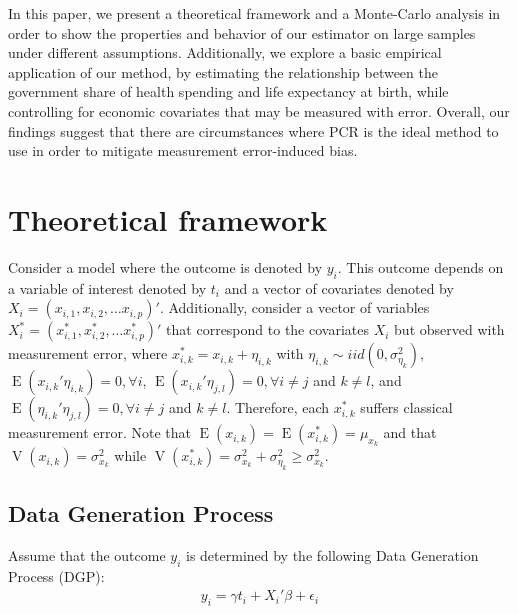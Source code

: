 \documentclass[10pt]{article}
\begin{document}
        In this paper, we present a theoretical framework and a Monte-Carlo analysis in order to show the properties and behavior of our estimator on large samples under different assumptions. Additionally, we explore a basic empirical application of our method, by estimating the relationship between the government share of health spending and life expectancy at birth, while controlling for economic covariates that may be measured with error. Overall, our findings suggest that there are circumstances where PCR is the ideal method to use in order to mitigate measurement error-induced bias.

    \section*{Theoretical framework}

        Consider a model where the outcome is denoted by $y_i$. This outcome depends on a variable of interest denoted by $t_i$ and a vector of covariates denoted by $X_i=(x_{i,1},x_{i,2},\dots x_{i,p})'$. Additionally, consider a vector of variables $X^*_i=(x^*_{i,1},x^*_{i,2},\dots x^*_{i,p})'$ that correspond to the covariates $X_i$ but observed with measurement error, where $x^*_{i,k}=x_{i,k}+\eta_{i,k}$ with $\eta_{i,k} \sim {iid}(0,\sigma^2_{\eta_k})$, $\operatorname{E}(x_{i,k}'\eta_{i,k})=0, \forall i$, $\operatorname{E}(x_{i,k}'\eta_{j,l})=0, \forall i\neq j$ and $k \neq l$, and $\operatorname{E}(\eta_{i,k}'\eta_{j,l})=0, \forall i\neq j$ and $k \neq l$. Therefore, each $x^*_{i,k}$ suffers classical measurement error. Note that $\operatorname{E}(x_{i,k})=\operatorname{E}(x^*_{i,k})=\mu_{x_k}$ and that $\operatorname{V}(x_{i,k})=\sigma^2_{x_k}$ while $\operatorname{V}(x^*_{i,k})=\sigma^2_{x_k}+\sigma^2_{\eta_k}\geq \sigma^2_{x_k}$.
        
    \subsection*{Data Generation Process}
        
        Assume that the outcome $y_i$ is determined by the following Data Generation Process (DGP):
        \begin{align}
            y_i = \gamma t_i + X_i'\beta + \epsilon_i
        \end{align}
        
\end{document}
